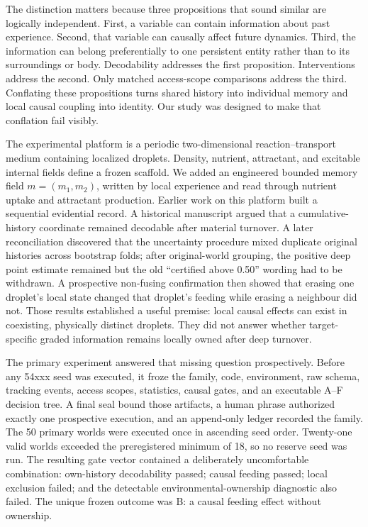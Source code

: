 \documentclass[11pt]{article}
\begin{document}
The distinction matters because three propositions that sound similar are logically independent. First, a variable can contain information about past experience. Second, that variable can causally affect future dynamics. Third, the information can belong preferentially to one persistent entity rather than to its surroundings or body. Decodability addresses the first proposition. Interventions address the second. Only matched access-scope comparisons address the third. Conflating these propositions turns shared history into individual memory and local causal coupling into identity. Our study was designed to make that conflation fail visibly.

The experimental platform is a periodic two-dimensional reaction--transport medium containing localized droplets. Density, nutrient, attractant, and excitable internal fields define a frozen scaffold. We added an engineered bounded memory field $m=(m_1,m_2)$, written by local experience and read through nutrient uptake and attractant production. Earlier work on this platform built a sequential evidential record. A historical manuscript argued that a cumulative-history coordinate remained decodable after material turnover. A later reconciliation discovered that the uncertainty procedure mixed duplicate original histories across bootstrap folds; after original-world grouping, the positive deep point estimate remained but the old ``certified above 0.50'' wording had to be withdrawn. A prospective non-fusing confirmation then showed that erasing one droplet's local state changed that droplet's feeding while erasing a neighbour did not. Those results established a useful premise: local causal effects can exist in coexisting, physically distinct droplets. They did not answer whether target-specific graded information remains locally owned after deep turnover.

The primary experiment answered that missing question prospectively. Before any 54xxx seed was executed, it froze the family, code, environment, raw schema, tracking events, access scopes, statistics, causal gates, and an executable A--F decision tree. A final seal bound those artifacts, a human phrase authorized exactly one prospective execution, and an append-only ledger recorded the family. The 50 primary worlds were executed once in ascending seed order. Twenty-one valid worlds exceeded the preregistered minimum of 18, so no reserve seed was run. The resulting gate vector contained a deliberately uncomfortable combination: own-history decodability passed; causal feeding passed; local exclusion failed; and the detectable environmental-ownership diagnostic also failed. The unique frozen outcome was B: a causal feeding effect without ownership.
\end{document}
